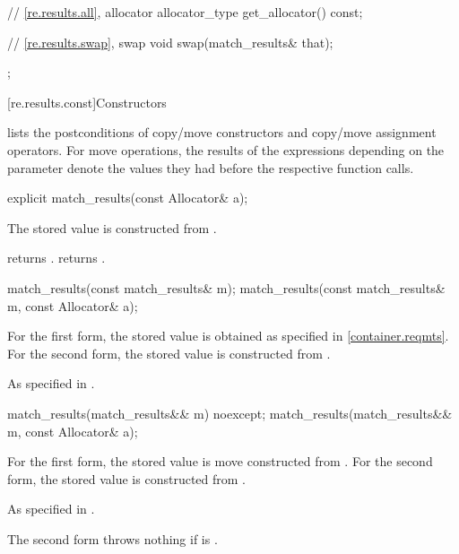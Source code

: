 \begin{codeblock}
{{      // \ref{re.results.all}, allocator
      allocator_type get_allocator() const;

      // \ref{re.results.swap}, swap
      void swap(match_results& that);
    };
}
\end{codeblock}

[re.results.const]{Constructors}

\pnum
{} lists the postconditions of
 copy/move constructors and copy/move assignment operators.
For move operations,
the results of the expressions depending on the parameter  denote
the values they had before the respective function calls.

%
\begin{itemdecl}
explicit match_results(const Allocator& a);
\end{itemdecl}

\begin{itemdescr}
\pnum
\effects
The stored  value is constructed from .

\pnum
\ensures
{} returns .
 returns .
\end{itemdescr}

%
\begin{itemdecl}
match_results(const match_results& m);
match_results(const match_results& m, const Allocator& a);
\end{itemdecl}

\begin{itemdescr}
\pnum
\effects
For the first form,
the stored  value is obtained
as specified in \ref{container.reqmts}.
For the second form,
the stored  value is constructed from .

\pnum
\ensures
As specified in .
\end{itemdescr}

%
\begin{itemdecl}
match_results(match_results&& m) noexcept;
match_results(match_results&& m, const Allocator& a);
\end{itemdecl}

\begin{itemdescr}
\pnum
\effects
For the first form,
the stored  value is move constructed from .
For the second form,
the stored  value is constructed from .

\pnum
\ensures
As specified in .

\pnum
\throws
The second form throws nothing if
 is .
\end{itemdescr}


